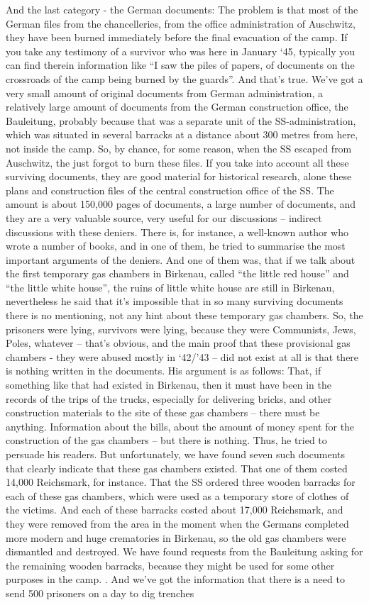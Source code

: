 And the last category - the German documents: The problem is that most of the German files from the chancelleries, from the office administration of Auschwitz, they have been burned immediately before the final evacuation of the camp. If you take any testimony of a survivor who was here in January ‘45, typically you can find therein information like “I saw the piles of papers, of documents on the crossroads of the camp being burned by the guards”. And that's true. We've got a very small amount of original documents from German administration, a relatively large amount of documents from the German construction office, the Bauleitung, probably because that was a separate unit of the SS-administration, which was situated in several barracks at a distance about 300 metres from here, not inside the camp. So, by chance, for some reason, when the SS escaped from Auschwitz, the just forgot to burn these files. If you take into account all these surviving documents, they are good material for historical research, alone these plans and construction files of the central construction office of the SS. The amount is about 150,000 pages of documents, a large number of documents, and they are a very valuable source, very useful for our discussions – indirect discussions with these deniers. There is, for instance, a well-known author who wrote a number of books, and in one of them, he tried to summarise the most important arguments of the deniers. And one of them was, that if we talk about the first temporary gas chambers in Birkenau, called “the little red house” and “the little white house”, the ruins of little white house are still in Birkenau, nevertheless he said that it’s impossible that in so many surviving documents there is no mentioning, not any hint about these temporary gas chambers. So, the prisoners were lying, survivors were lying, because they were Communists, Jews, Poles, whatever – that’s obvious, and the main proof that these provisional gas chambers - they were abused mostly in ‘42/’43 – did not exist at all is that there is nothing written in the documents. His argument is as follows: That, if something like that had existed in Birkenau, then it must have been in the records of the trips of the trucks, especially for delivering bricks, and other construction materials to the site of these gas chambers – there must be anything. Information about the bills, about the amount of money spent for the construction of the gas chambers – but there is nothing. Thus, he tried to persuade his readers. But unfortunately, we have found seven such documents that clearly indicate that these gas chambers existed. That one of them costed 14,000 Reichsmark, for instance. That the SS ordered three wooden barracks for each of these gas chambers, which were used as a temporary store of clothes of the victims. And each of these barracks costed about 17,000 Reichsmark, and they were removed from the area in the moment when the Germans completed more modern and huge crematories in Birkenau, so the old gas chambers were dismantled and destroyed. We have found requests from the Bauleitung asking for the remaining wooden barracks, because they might be used for some other purposes in the camp. . And we’ve got the information that there is a need to send 500 prisoners on a day to dig trenches 
